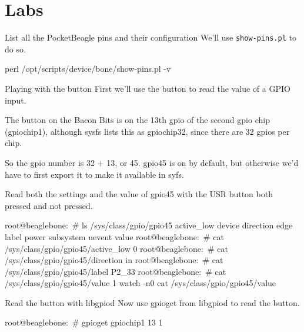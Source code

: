 \clearpage\section{Labs}\begin{Lab}


\begin{exe} {List all the PocketBeagle pins and their configuration}
   We'll use \verb?show-pins.pl? to do so.

   \begin{sol}
      \begin{raw}
perl /opt/scripts/device/bone/show-pins.pl -v
      \end{raw}
   \end{sol}
\end{exe}

\begin{exe} {Playing with the button}
   First we'll use the button to read the value of a GPIO input.

   The button on the Bacon Bits is on the 13th gpio of the second gpio chip
   (gpiochip1), although sysfs lists this as gpiochip32, since there are
   32 gpios per chip.

   So the gpio number is 32 + 13, or 45. gpio45 is on by default, but
   otherwise we'd have to first export it to make it available in syfs.

   Read both the settings and the value of gpio45 with the USR button both
   pressed and not pressed.

   \begin{sol}
      \begin{raw}
root@beaglebone:~# ls /sys/class/gpio/gpio45
active_low  device  direction  edge  label  power  subsystem  uevent  value
root@beaglebone:~# cat /sys/class/gpio/gpio45/active_low 
0
root@beaglebone:~# cat /sys/class/gpio/gpio45/direction 
in
root@beaglebone:~# cat /sys/class/gpio/gpio45/label 
P2_33
root@beaglebone:~# cat /sys/class/gpio/gpio45/value 
1
watch -n0 cat /sys/class/gpio/gpio45/value
      \end{raw}
   \end{sol}
\end{exe}

\begin{exe} {Read the button with libgpiod}
   Now use gpioget from libgpiod to read the button.

   \begin{sol}
      \begin{raw}
root@beaglebone:~# gpioget gpiochip1 13
1
      \end{raw}
   \end{sol}
\end{exe}


\end{Lab}
